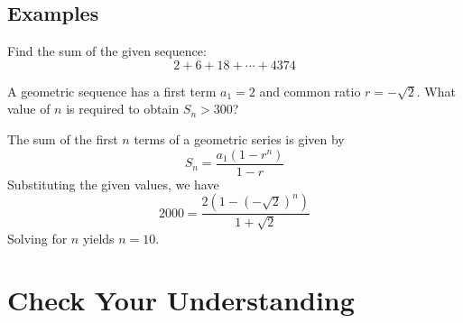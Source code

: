 \documentclass[addpoints]{exam}
\begin{document}
\subsection*{Examples}

\begin{questions}
    \question Find the sum of the given sequence: \[2+6+18+\cdots+4374\]


    \question A geometric sequence has a first term $a_1=2$ and common ratio $r=-\sqrt{2}$. What value of $n$ is required to obtain $S_n>300$?
    \begin{solution}
        The sum of the first $n$ terms of a geometric series is given by
        \[S_n=\frac{a_1(1-r^n)}{1-r}\]
        Substituting the given values, we have
        \[2000=\frac{2(1-(-\sqrt{2})^n)}{1+\sqrt{2}}\]
        Solving for $n$ yields $n=10$.
    \end{solution}


\end{questions}

\newpage

\section*{Check Your Understanding}
\end{document}
